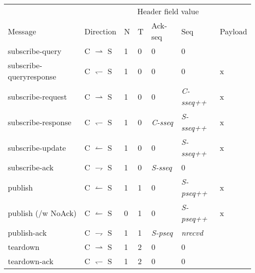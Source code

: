\begin{tabular}{|l|l|l|l|l|l|l|}
\hline
						& 							& \multicolumn{4}{c|}{Header field value} &	\\
Message					& Direction 				& N	& T	& Ack-seq				& Seq	&	Payload \\
\hline
subscribe-query			& C $\rightharpoonup$ S		& 1	& 0 	& 0						& 0	&	\\
\hline
subscribe-queryresponse	& C $\leftharpoondown$ S	& 1	& 0		& 0						& 0	&	x \\
\hline
subscribe-request		& C $\rightharpoonup$ S		& 1	& 0		& 0						& \emph{C-sseq++} &
	x \\
\hline
subscribe-response		& C $\leftharpoondown$ S	& 1	& 0		& \emph{C-sseq}	& \emph{S-sseq++} &	
	x \\
\hline
subscribe-update		& C $\leftharpoonup$ S		& 1	& 0		& 0						& \emph{S-sseq++} &
	x \\
\hline
subscribe-ack			& C $\rightharpoondown$ S	& 1	& 0		& \emph{S-sseq}	& 0	&	\\
\hline
publish					& C $\leftharpoonup$ S		& 1	& 1		& 0						& \emph{S-pseq++} &
	x \\
\hline
publish	(/w NoAck)      & C $\leftharpoonup$ S		& 0	& 1		& 0						& \emph{S-pseq++} &
	x \\
\hline
publish-ack				& C $\rightharpoondown$ S	& 1	& 1		& \emph{S-pseq}			& \emph{nrecvd}	&	\\
\hline
teardown		      & C $\rightharpoonup$ S		& 1	& 2		& 0			& 0	& \\
\hline
teardown-ack		& C $\leftharpoondown$ S 		& 1 & 2		& 0			& 0 &	\\
			
\hline
\end{tabular}